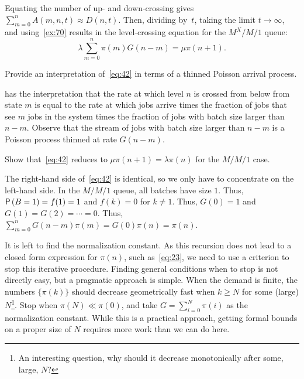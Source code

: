 Equating the number of up- and down-crossing gives $\sum_{m=0}^n A(m,n,t) \approx  D(n,t)$. 
Then, dividing by~$t$,  taking the limit $t\to\infty$, and using~\cref{ex:70} results in the level-crossing equation for the $M^X/M/1$ queue:
\begin{equation}\label{eq:42}
\lambda  \sum_{m=0}^n \pi(m) G(n-m) = \mu \pi(n+1).
\end{equation}

\begin{exercise}
Provide an interpretation of~\cref{eq:42} in terms of a thinned Poisson arrival process.
\begin{solution}
   has the interpretation that the rate at which level $n$ is crossed from below from state $m$ is equal to the rate at which jobs arrive times the fraction of jobs that see $m$ jobs in the system times the fraction of jobs with batch size larger than $n-m$.
  Observe that the stream of jobs with batch size larger than $n-m$ is a Poisson process thinned at rate $G(n-m)$.
\end{solution}
\end{exercise}


\begin{extra}
  Show that~\cref{eq:42} reduces to $\mu \pi(n+1)=\lambda \pi(n)$ for the $M/M/1$ case.
  \begin{solution}
    The right-hand side of~\cref{eq:42} is identical, so we only have to concentrate on the left-hand side.
    In the $M/M/1$ queue, all batches have size $1$.
    Thus, $\P{B=1} = f(1)=1$ and $f(k)=0$ for $k\neq 1$.
    Thus, $G(0)=1$ and $G(1)=G(2)=\cdots = 0$.
    Thus, $\sum_{m=0}^n G(n-m) \pi(m) = G(0)\pi(n)=\pi(n)$.
  \end{solution}
\end{extra}



It is left to find the normalization constant.
As this recursion does not lead to a closed form expression for $\pi(n)$, such as~\cref{eq:23}, we need to use a criterion to stop this iterative procedure.
Finding general conditions when to stop is not directly easy, but a pragmatic approach is simple.
When the demand is finite, the numbers $\{\pi(k)\}$ should decrease geometrically fast when $k\geq N$ for some (large) $N$\footnote{An interesting question, why should it decrease monotonically after some, large, $N$?}.
Stop when $\pi(N)\ll \pi(0)$, and take $G=\sum_{i=0}^N \pi(i)$ as the normalization constant.
While this is a practical approach, getting formal bounds on a proper size of $N$ requires more work than we can do here.

